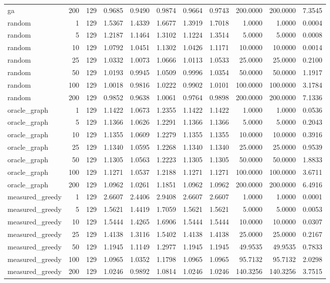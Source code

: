 \begin{table}[t]
\begin{tabular}{lrrrrrrrrrr}
ga & 200 & 129 & 0.9685 & 0.9490 & 0.9874 & 0.9664 & 0.9743 & 200.0000 & 200.0000 & 7.3545 \\
random & 1 & 129 & 1.5367 & 1.4339 & 1.6677 & 1.3919 & 1.7018 & 1.0000 & 1.0000 & 0.0004 \\
random & 5 & 129 & 1.2187 & 1.1464 & 1.3102 & 1.1224 & 1.3514 & 5.0000 & 5.0000 & 0.0008 \\
random & 10 & 129 & 1.0792 & 1.0451 & 1.1302 & 1.0426 & 1.1171 & 10.0000 & 10.0000 & 0.0014 \\
random & 25 & 129 & 1.0332 & 1.0073 & 1.0666 & 1.0113 & 1.0533 & 25.0000 & 25.0000 & 0.2100 \\
random & 50 & 129 & 1.0193 & 0.9945 & 1.0509 & 0.9996 & 1.0354 & 50.0000 & 50.0000 & 1.1917 \\
random & 100 & 129 & 1.0018 & 0.9816 & 1.0222 & 0.9902 & 1.0101 & 100.0000 & 100.0000 & 3.1784 \\
random & 200 & 129 & 0.9852 & 0.9638 & 1.0061 & 0.9764 & 0.9898 & 200.0000 & 200.0000 & 7.1336 \\
oracle\_graph & 1 & 129 & 1.1422 & 1.0673 & 1.2355 & 1.1422 & 1.1422 & 1.0000 & 1.0000 & 0.0536 \\
oracle\_graph & 5 & 129 & 1.1366 & 1.0626 & 1.2291 & 1.1366 & 1.1366 & 5.0000 & 5.0000 & 0.2043 \\
oracle\_graph & 10 & 129 & 1.1355 & 1.0609 & 1.2279 & 1.1355 & 1.1355 & 10.0000 & 10.0000 & 0.3916 \\
oracle\_graph & 25 & 129 & 1.1340 & 1.0595 & 1.2268 & 1.1340 & 1.1340 & 25.0000 & 25.0000 & 0.9539 \\
oracle\_graph & 50 & 129 & 1.1305 & 1.0563 & 1.2223 & 1.1305 & 1.1305 & 50.0000 & 50.0000 & 1.8833 \\
oracle\_graph & 100 & 129 & 1.1271 & 1.0537 & 1.2188 & 1.1271 & 1.1271 & 100.0000 & 100.0000 & 3.6711 \\
oracle\_graph & 200 & 129 & 1.0962 & 1.0261 & 1.1851 & 1.0962 & 1.0962 & 200.0000 & 200.0000 & 6.4916 \\
measured\_greedy & 1 & 129 & 2.6607 & 2.4406 & 2.9408 & 2.6607 & 2.6607 & 1.0000 & 1.0000 & 0.0001 \\
measured\_greedy & 5 & 129 & 1.5621 & 1.4419 & 1.7059 & 1.5621 & 1.5621 & 5.0000 & 5.0000 & 0.0053 \\
measured\_greedy & 10 & 129 & 1.5444 & 1.4265 & 1.6906 & 1.5444 & 1.5444 & 10.0000 & 10.0000 & 0.0307 \\
measured\_greedy & 25 & 129 & 1.4138 & 1.3116 & 1.5402 & 1.4138 & 1.4138 & 25.0000 & 25.0000 & 0.2167 \\
measured\_greedy & 50 & 129 & 1.1945 & 1.1149 & 1.2977 & 1.1945 & 1.1945 & 49.9535 & 49.9535 & 0.7833 \\
measured\_greedy & 100 & 129 & 1.0965 & 1.0352 & 1.1798 & 1.0965 & 1.0965 & 95.7132 & 95.7132 & 2.0298 \\
measured\_greedy & 200 & 129 & 1.0246 & 0.9892 & 1.0814 & 1.0246 & 1.0246 & 140.3256 & 140.3256 & 3.7515 \\
\bottomrule
\end{tabular}
\end{table}
